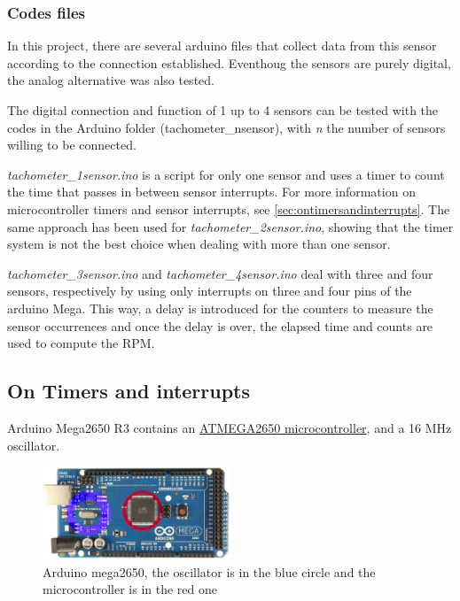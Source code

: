 \documentclass[a4paper]{article}
\begin{document}
\subsubsection{Codes files}
In this project, there are several arduino files that collect data from this sensor according to the connection established. Eventhoug the sensors are purely digital, the analog alternative was also tested.



The digital connection and function of 1 up to 4 sensors can be tested with the codes in the Arduino folder (tachometer\_nsensor), with \textit{n} the number of sensors willing to be connected.

\textit{tachometer\_1sensor.ino} is a script for only one sensor and uses a timer to count the time that passes in between sensor interrupts. For more information on microcontroller timers and sensor interrupts, see \autoref{sec:ontimersandinterrupts}. The same approach has been used for \textit{tachometer\_2sensor.ino}, showing that the timer system is not the best choice when dealing with more than one sensor.

\textit{tachometer\_3sensor.ino} and \textit{tachometer\_4sensor.ino} deal with three and four sensors, respectively by using only interrupts on three and four pins of the arduino Mega. This way, a delay is introduced for the counters to measure the sensor occurrences and once the delay is over, the elapsed time and counts are used to compute the RPM.


\subsection{On Timers and interrupts}
\label{sec:ontimersandinterrupts}

Arduino Mega2650 R3 contains an \hyperref{https://ww1.microchip.com/downloads/en/devicedoc/atmel-2549-8-bit-avr-microcontroller-atmega640-1280-1281-2560-2561_datasheet.pdf}{category}{name}{ATMEGA2650 microcontroller}, and a 16 MHz oscillator.

\begin{figure}[h!]
	\centering
	\includegraphics[width=0.5\textwidth]{arduino_mega.png}
	\caption{Arduino mega2650, the oscillator is in the blue circle and the microcontroller is in the red one}
	\label{fig:arduino_mega}
\end{figure}
\end{document}

